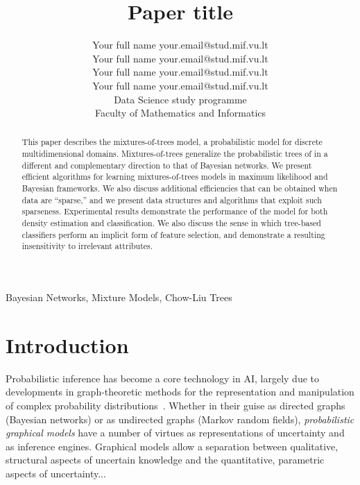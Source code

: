 \documentclass[twoside,11pt]{article}
\begin{document}
\title{Paper title}

\author{\name Your full name \email your.email@stud.mif.vu.lt \\
\name Your full name \email your.email@stud.mif.vu.lt \\
\name Your full name \email your.email@stud.mif.vu.lt \\
\name Your full name \email your.email@stud.mif.vu.lt \\
       \addr Data Science study programme\\
       Faculty of Mathematics and Informatics}


\maketitle

\begin{abstract}%
This paper describes the mixtures-of-trees model, a probabilistic 
model for discrete multidimensional domains.  Mixtures-of-trees 
generalize the probabilistic trees of \citet{chow:68}
in a different and complementary direction to that of Bayesian networks.
We present efficient algorithms for learning mixtures-of-trees 
models in maximum likelihood and Bayesian frameworks. 
We also discuss additional efficiencies that can be
obtained when data are ``sparse,'' and we present data 
structures and algorithms that exploit such sparseness.
Experimental results demonstrate the performance of the 
model for both density estimation and classification. 
We also discuss the sense in which tree-based classifiers
perform an implicit form of feature selection, and demonstrate
a resulting insensitivity to irrelevant attributes.
\end{abstract}

\begin{keywords}
  Bayesian Networks, Mixture Models, Chow-Liu Trees
\end{keywords}

\section{Introduction}

Probabilistic inference has become a core technology in AI,
largely due to developments in graph-theoretic methods for the 
representation and manipulation of complex probability 
distributions~\citep{pearl:88}.  Whether in their guise as 
directed graphs (Bayesian networks) or as undirected graphs (Markov 
random fields), \emph{probabilistic graphical models} have a number 
of virtues as representations of uncertainty and as inference engines.  
Graphical models allow a separation between qualitative, structural
aspects of uncertain knowledge and the quantitative, parametric aspects 
of uncertainty...\\
\end{document}
